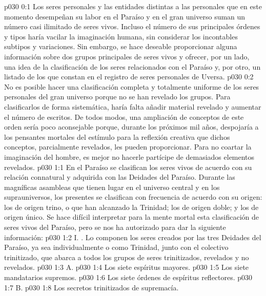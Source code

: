 \author{Mensajero poderoso}
\vs p030 0:1 Los seres personales y las entidades distintas a las personales que en este momento desempeñan su labor en el Paraíso y en el gran universo suman un número casi ilimitado de seres vivos. Incluso el número de sus principales órdenes y tipos haría vacilar la imaginación humana, sin considerar los incontables subtipos y variaciones. Sin embargo, se hace deseable proporcionar alguna información sobre dos grupos principales de seres vivos y ofrecer, por un lado, una idea de la clasificación de los seres relacionados con el Paraíso y, por otro, un listado de los que constan en el registro de seres personales de Uversa.
\vs p030 0:2 No es posible hacer una clasificación completa y totalmente uniforme de los seres personales del gran universo porque no se han revelado  los grupos. Para clasificarlos de forma sistemática, haría falta añadir material revelado y aumentar el número de escritos. De todos modos, una ampliación de conceptos de este orden sería poco aconsejable porque, durante los próximos mil años, despojaría a los pensantes mortales del estímulo para la reflexión creativa que dichos conceptos, parcialmente revelados, les pueden proporcionar. Para no coartar la imaginación del hombre, es mejor no hacerle partícipe de demasiados elementos revelados.
\vs p030 1:1 En el Paraíso se clasifican los seres vivos de acuerdo con su relación connatural y adquirida con las Deidades del Paraíso. Durante las magníficas asambleas que tienen lugar en el universo central y en los suprauniversos, los presentes se clasifican con frecuencia de acuerdo con su origen: los de origen trino, o que han alcanzado la Trinidad; los de origen doble; y los de origen único. Se hace difícil interpretar para la mente mortal esta clasificación de seres vivos del Paraíso, pero se nos ha autorizado para dar la siguiente información:
\vs p030 1:2 \pc I. . Lo componen los seres creados por las tres Deidades del Paraíso, ya sea individualmente o como Trinidad, junto con el colectivo trinitizado, que abarca a todos los grupos de seres trinitizados, revelados y no revelados.
\vs p030 1:3 \pc A. 
\vs p030 1:4 Los siete espíritus mayores.
\vs p030 1:5 Los siete mandatarios supremos.
\vs p030 1:6 Los siete órdenes de espíritus reflectores.
\vs p030 1:7 \pc B. 
\vs p030 1:8 Los secretos trinitizados de supremacía.
